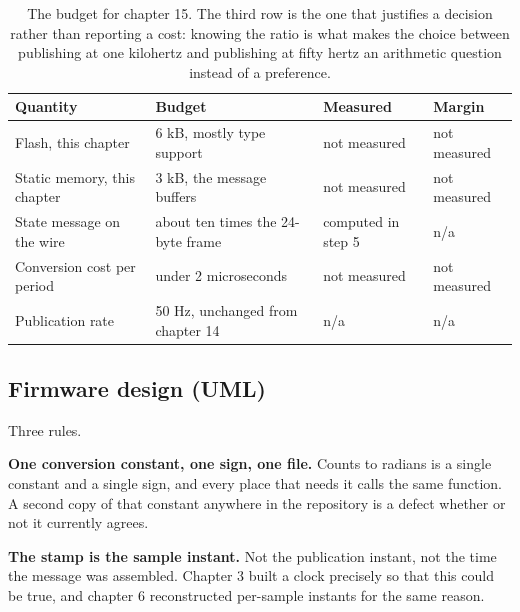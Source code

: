 \begin{table}[H]\centering\small
\begin{tabular}{p{44mm}p{28mm}p{28mm}p{30mm}}
\toprule
Quantity & Budget & Measured & Margin \\
\midrule
Flash, this chapter & 6 kB, mostly type support & not measured & not measured \\
Static memory, this chapter & 3 kB, the message buffers & not measured & not measured \\
State message on the wire & about ten times the 24-byte frame & computed in step 5 & n/a \\
Conversion cost per period & under 2 microseconds & not measured & not measured \\
Publication rate & 50 Hz, unchanged from chapter 14 & n/a & n/a \\
\bottomrule
\end{tabular}
\caption{The budget for chapter 15. The third row is the one that justifies a decision rather than reporting a cost: knowing the ratio is what makes the choice between publishing at one kilohertz and publishing at fifty hertz an arithmetic question instead of a preference.}
\end{table}

\subsection*{Firmware design (UML)}


Three rules.

\textbf{One conversion constant, one sign, one file.} Counts to radians is a
single constant and a single sign, and every place that needs it calls the same
function. A second copy of that constant anywhere in the repository is a defect
whether or not it currently agrees.

\textbf{The stamp is the sample instant.} Not the publication instant, not the
time the message was assembled. Chapter 3 built a clock precisely so that this
could be true, and chapter 6 reconstructed per-sample instants for the same
reason.

